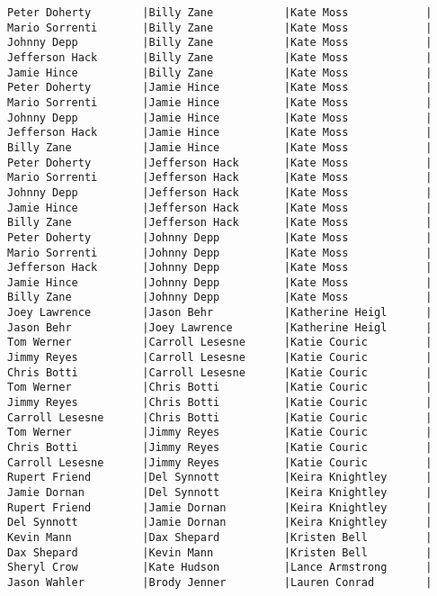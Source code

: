 \documentclass{article}
\begin{document}
\begin{verbatim}
Peter Doherty        |Billy Zane           |Kate Moss            |
Mario Sorrenti       |Billy Zane           |Kate Moss            |
Johnny Depp          |Billy Zane           |Kate Moss            |
Jefferson Hack       |Billy Zane           |Kate Moss            |
Jamie Hince          |Billy Zane           |Kate Moss            |
Peter Doherty        |Jamie Hince          |Kate Moss            |
Mario Sorrenti       |Jamie Hince          |Kate Moss            |
Johnny Depp          |Jamie Hince          |Kate Moss            |
Jefferson Hack       |Jamie Hince          |Kate Moss            |
Billy Zane           |Jamie Hince          |Kate Moss            |
Peter Doherty        |Jefferson Hack       |Kate Moss            |
Mario Sorrenti       |Jefferson Hack       |Kate Moss            |
Johnny Depp          |Jefferson Hack       |Kate Moss            |
Jamie Hince          |Jefferson Hack       |Kate Moss            |
Billy Zane           |Jefferson Hack       |Kate Moss            |
Peter Doherty        |Johnny Depp          |Kate Moss            |
Mario Sorrenti       |Johnny Depp          |Kate Moss            |
Jefferson Hack       |Johnny Depp          |Kate Moss            |
Jamie Hince          |Johnny Depp          |Kate Moss            |
Billy Zane           |Johnny Depp          |Kate Moss            |
Joey Lawrence        |Jason Behr           |Katherine Heigl      |
Jason Behr           |Joey Lawrence        |Katherine Heigl      |
Tom Werner           |Carroll Lesesne      |Katie Couric         |
Jimmy Reyes          |Carroll Lesesne      |Katie Couric         |
Chris Botti          |Carroll Lesesne      |Katie Couric         |
Tom Werner           |Chris Botti          |Katie Couric         |
Jimmy Reyes          |Chris Botti          |Katie Couric         |
Carroll Lesesne      |Chris Botti          |Katie Couric         |
Tom Werner           |Jimmy Reyes          |Katie Couric         |
Chris Botti          |Jimmy Reyes          |Katie Couric         |
Carroll Lesesne      |Jimmy Reyes          |Katie Couric         |
Rupert Friend        |Del Synnott          |Keira Knightley      |
Jamie Dornan         |Del Synnott          |Keira Knightley      |
Rupert Friend        |Jamie Dornan         |Keira Knightley      |
Del Synnott          |Jamie Dornan         |Keira Knightley      |
Kevin Mann           |Dax Shepard          |Kristen Bell         |
Dax Shepard          |Kevin Mann           |Kristen Bell         |
Sheryl Crow          |Kate Hudson          |Lance Armstrong      |
Jason Wahler         |Brody Jenner         |Lauren Conrad        |

\end{verbatim}
\end{document}
